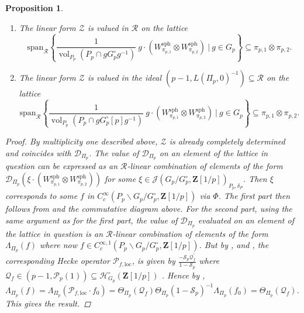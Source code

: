 \documentclass{amsart}%
\theoremstyle{plain}
\newtheorem{prop}[thm]{Proposition}
\theoremstyle{plain}
\theoremstyle{remark}
\DeclareMathOperator{\vol}{vol}
\begin{document}
\begin{prop}
\begin{enumerate}
    \item The linear form $\mathcal{Z}$ is valued in $\mathcal{R}$ on the lattice 
    $$\mathrm{span}_{\mathcal{R}}\left\{\frac{1}{\vol_{P_p}(P_p\cap gG_p^\circ g^{-1})}\ g\cdot (W_{\pi_{p,1}}^\mathrm{sph}\otimes W_{\pi_{p,2}}^\mathrm{sph})\ |\ g\in G_p\right\}\subseteq\pi_{p,1}\otimes\pi_{p,2}.$$
    \item The linear form $\mathcal{Z}$ is valued in the ideal $\left(p-1,L(\Pi_p,0)^{-1}\right)\subseteq\mathcal{R}$ on the lattice 
    $$\mathrm{span}_\mathcal{R}\left\{\frac{1}{\vol_{P_p}(P_p\cap gG_p^\circ[p] g^{-1})}\ g\cdot (W_{\pi_{p,1}}^\mathrm{sph}\otimes W_{\pi_{p,2}}^\mathrm{sph})\ |\ g\in G_p\right\}\subseteq\pi_{p,1}\otimes\pi_{p,2}.$$
    \end{enumerate}
    \begin{proof}
    By multiplicity one described above, $\mathcal{Z}$ is already completely determined and coincides with $\mathscr{D}_{\Pi_p}$. The value of $\mathscr{D}_{\Pi_p}$ on an element of the lattice in question can be expressed as an 
$\mathcal{R}$-linear combination of elements of the form $\mathscr{D}_{\Pi_p}\left(\xi\cdot (W_{\pi_{p,1}}^\mathrm{sph}\otimes W_{\pi_{p,2}}^\mathrm{sph})\right)$ for some $\xi\in\mathcal{J}(G_p/G_p^\circ,\mathbf{Z}[1/p])_{P_p,\delta_P}$. Then $\xi$ corresponds to some $f$ in $C_c^\infty(P_p\backslash G_p/G_p^\circ,\mathbf{Z}[1/p])$ via $\Phi$. The first part then follows from  and the commutative diagram above. For the second part, using the same argument as for the first part, the value of $\mathscr{D}_{\Pi_p}$ evaluated on an element of the lattice in question is an $\mathcal{R}$-linear combination of elements of the form $\Lambda_{\Pi_p}(f)$ where now $f\in C_c^{\infty,1}(P_p\backslash G_p/G_p^\circ,\mathbf{Z}[1/p])$. But by , and , the corresponding Hecke operator $\mathcal{P}_{f,\mathrm{loc}}$, is given by $\tfrac{-\mathcal{S}_p\mathcal{Q}_f^{'}}{1-\mathcal{S}_p}$ where $\mathcal{Q}_f\in(p-1,\mathcal{P}_p(1))\subseteq\mathcal{H}_{G_p}^\circ(\mathbf{Z}[1/p])$ . Hence by , $\Lambda_{\Pi_p}(f)=\Lambda_{\Pi_p}(\mathcal{P}_{f,\mathrm{loc}}\cdot f_0)=\Theta_{\Pi_p}(\mathcal{Q}_f)\Theta_{\Pi_p}(1-\mathcal{S}_p)^{-1}\Lambda_{\Pi_p}(f_0)=\Theta_{\Pi_p}(\mathcal{Q}_f)$. This gives the result.
\end{proof}
\end{prop}
\end{document}
